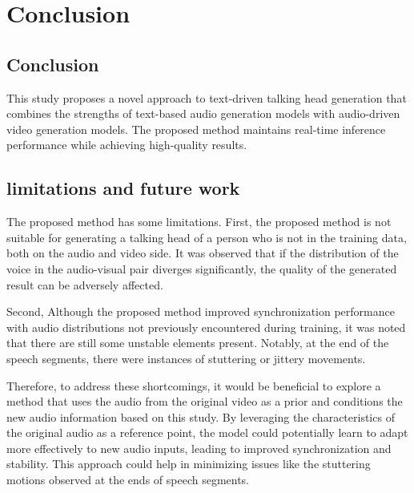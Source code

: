 \chapter{Conclusion}
\label{chap:conclusion}

\section {Conclusion}
This study proposes a novel approach to text-driven talking head generation
that combines the strengths of text-based audio generation models with audio-driven video generation models.
The proposed method maintains real-time inference performance while achieving high-quality results.

\section{limitations and future work}
\label{sec:limitations_and_future_work}
The proposed method has some limitations.
First, the proposed method is not suitable for generating a talking head of a person who is not in the training data,
both on the audio and video side. 
It was observed that if the distribution of the voice in the audio-visual pair diverges significantly,
the quality of the generated result can be adversely affected. 

Second, 
Although the proposed method improved synchronization performance with audio distributions not previously encountered during training,
it was noted that there are still some unstable elements present. Notably, at the end of the speech segments, there were instances of stuttering or jittery movements.


Therefore, to address these shortcomings, it would be beneficial to explore a method that uses the audio from the original video as a prior and conditions the new audio information based on this study.
By leveraging the characteristics of the original audio as a reference point, the model could potentially learn to adapt more effectively to new audio inputs, leading to improved synchronization and stability. This approach could help in minimizing issues like the stuttering motions observed at the ends of speech segments.

